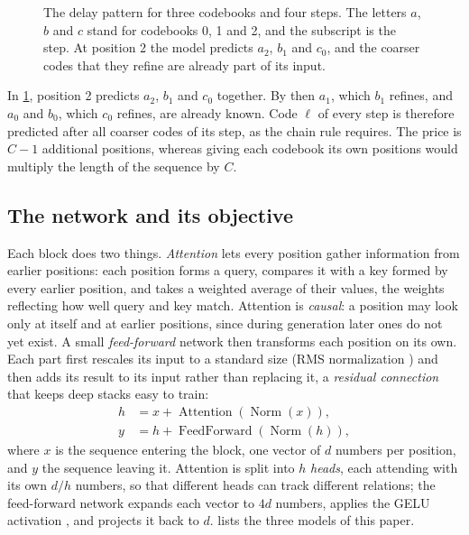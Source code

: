 \begin{figure}[htbp]
\centering

\caption{The delay pattern for three codebooks and four steps. The letters
$a$, $b$ and $c$ stand for codebooks 0, 1 and 2, and the subscript is the step.
At position 2 the model predicts $a_2$, $b_1$ and $c_0$, and the coarser codes
that they refine are already part of its input.}
\label{fig:delay}
\end{figure}

In \cref{fig:delay}, position 2 predicts $a_2$, $b_1$ and $c_0$ together. By then
$a_1$, which $b_1$ refines, and $a_0$ and $b_0$, which $c_0$ refines, are already
known. Code $\ell$ of every step is therefore predicted after all coarser codes
of its step, as the chain rule requires. The price is $C - 1$ additional
positions, whereas giving each codebook its own positions would multiply the
length of the sequence by $C$.

\subsection{The network and its objective}
\label{sec:objective}

Each block does two things. \emph{Attention} lets every position gather
information from earlier positions: each position forms a query, compares it
with a key formed by every earlier position, and takes a weighted average of
their values, the weights reflecting how well query and key match. Attention
is \emph{causal}: a position may look only at itself and at earlier positions,
since during generation later ones do not yet exist. A small
\emph{feed-forward} network then transforms each position on its own. Each
part first rescales its input to a standard size (RMS normalization
\cite{zhang2019rmsnorm,xiong2020layernorm}) and then adds its result to its
input rather than replacing it, a \emph{residual connection} that keeps deep
stacks easy to train:
\begin{align*}
h &= x + \operatorname{Attention}(\operatorname{Norm}(x)), \\
y &= h + \operatorname{FeedForward}(\operatorname{Norm}(h)),
\end{align*}
where $x$ is the sequence entering the block, one vector of $d$ numbers per
position, and $y$ the sequence leaving it. Attention is split into $h$
\emph{heads}, each attending with its own $d/h$ numbers, so that different
heads can track different relations; the feed-forward network expands each
vector to $4d$ numbers, applies the GELU activation \cite{hendrycks2016gelu},
and projects it back to $d$.  lists the three models of this
paper.

